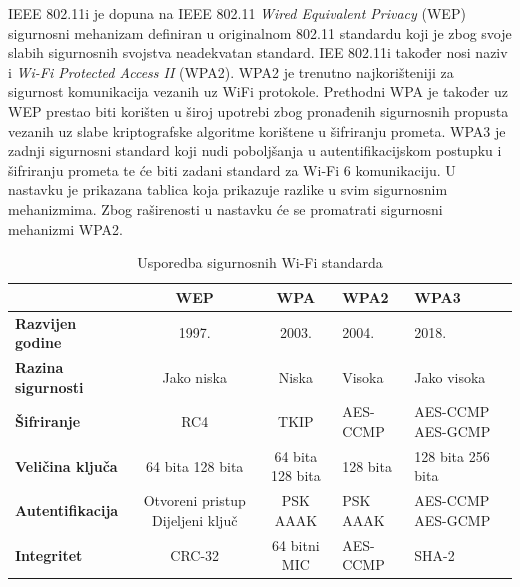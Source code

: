 \documentclass[times, utf8, diplomski]{fer}
\begin{document}
IEEE 802.11i je dopuna na IEEE 802.11 \emph{Wired Equivalent Privacy} (WEP) sigurnosni mehanizam definiran u originalnom 802.11 standardu koji je zbog svoje slabih sigurnosnih svojstva neadekvatan standard. IEE 802.11i također nosi naziv i \emph{Wi-Fi Protected Access II} (WPA2). WPA2 je trenutno najkorišteniji za sigurnost komunikacija vezanih uz WiFi protokole. Prethodni WPA je također uz WEP prestao biti korišten u široj upotrebi zbog pronađenih sigurnosnih propusta vezanih uz slabe kriptografske algoritme korištene u šifriranju prometa. WPA3 je zadnji sigurnosni standard koji nudi poboljšanja u autentifikacijskom postupku i šifriranju prometa te će biti zadani standard za Wi-Fi 6 komunikaciju. U nastavku je prikazana tablica koja prikazuje razlike u svim sigurnosnim mehanizmima. Zbog raširenosti u nastavku će se promatrati sigurnosni mehanizmi WPA2.
\begin{table}[H]
    \centering
    \caption{Usporedba sigurnosnih Wi-Fi standarda}
    \begin{tabular}{| M || S | S | X | X |} 
    \hline
                              & \textbf{WEP} & \textbf{WPA} & \textbf{WPA2} & \textbf{WPA3}\\
    \hline\hline
    \textbf{Razvijen godine}         & 1997. & 2003. & 2004. & 2018.\\
    \hline
    \textbf{Razina sigurnosti}& Jako niska & Niska & Visoka & Jako visoka\\ 
    \hline
    \textbf{{Šifriranje}}     &  RC4 & TKIP & AES-CCMP & AES-CCMP AES-GCMP\\ 
    \hline
    \textbf{Veličina ključa}  & 64 bita \hspace{0.2cm}128 bita & 64 bita\hspace{0.2cm} 128 bita &  128 bita & 128 bita \hspace{1cm}256 bita\\ 
    \hline
    \textbf{Autentifikacija}  & Otvoreni pristup Dijeljeni ključ & PSK AAAK & PSK \hspace{1cm}AAAK & AES-CCMP AES-GCMP\\ 
    \hline
    \textbf{Integritet}       & CRC-32 & 64 bitni MIC & AES-CCMP & SHA-2\\ 
    \hline
    \end{tabular}
    \label{tab:wpa}
\end{table}
\end{document}
